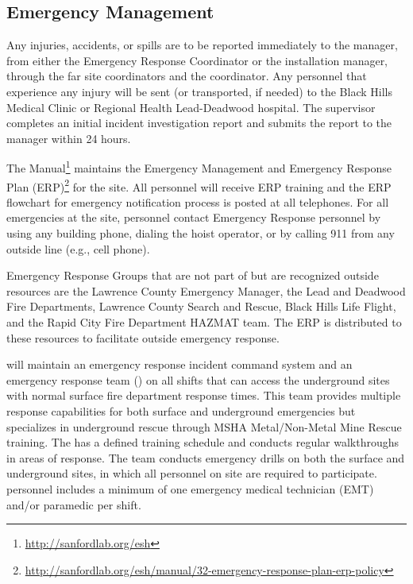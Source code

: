 \subsection{Emergency Management}

Any injuries, accidents, or spills are to be reported immediately to the
  manager, from either the  Emergency
Response Coordinator or the installation manager, through the  far site
 coordinators and the   coordinator. %
Any personnel that
experience any injury will be sent (or transported, if needed) to the Black Hills
Medical Clinic or Regional Health Lead-Deadwood hospital. %
The supervisor  completes an initial incident
investigation report and submits the report to the 
 manager within 24 hours.


The  
Manual\footnote{\url{http://sanfordlab.org/esh}} maintains the Emergency
Management and Emergency Response Plan 
(ERP)\footnote{\url{http://sanfordlab.org/esh/manual/32-emergency-response-plan-erp-policy}}
for the site. All personnel will receive ERP training and the ERP
flowchart for emergency notification process is posted at all
telephones. For all emergencies at the  site, personnel
contact Emergency Response personnel by using any building
phone, dialing the hoist operator, or by calling 911 from any outside
line (e.g., cell phone).

Emergency Response Groups that are not part of  but are recognized
outside resources are the Lawrence County Emergency Manager, the Lead and
Deadwood Fire Departments, Lawrence County Search and Rescue, Black
Hills Life Flight, and the Rapid City Fire Department HAZMAT team. The
 ERP is distributed to these resources to facilitate outside
emergency response.

 will maintain an emergency response incident command
system and an emergency response team () on all shifts that can access the
underground sites with normal surface fire department response
times. This team provides multiple response capabilities for both
surface and underground emergencies but specializes in underground
rescue through MSHA Metal/Non-Metal Mine Rescue training.  
The  has a defined training schedule and conducts regular
walkthroughs in areas of response. The team conducts  emergency drills 
on both the surface and underground sites, in which all personnel on
site are required to participate.  personnel includes a
minimum of one emergency medical technician (EMT) and/or paramedic per
shift. 

